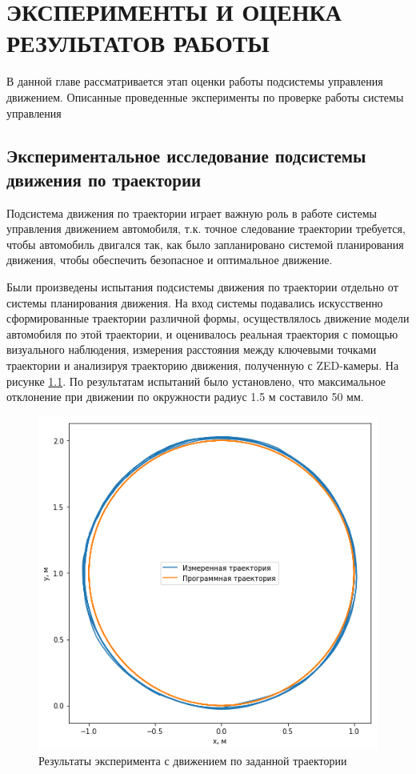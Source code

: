 \chapter{ЭКСПЕРИМЕНТЫ И ОЦЕНКА РЕЗУЛЬТАТОВ РАБОТЫ}

В данной главе рассматривается этап оценки работы подсистемы
управления движением. Описанные проведенные эксперименты по проверке
работы системы управления

\section{Экспериментальное исследование подсистемы движения по траектории }
Подсистема движения по траектории играет важную роль в работе системы управления движением автомобиля, т.к. точное
следование траектории требуется, чтобы автомобиль двигался так, как было запланировано системой планирования движения,
чтобы обеспечить безопасное и оптимальное движение.

Были произведены испытания подсистемы движения по траектории отдельно от системы планирования движения.
На вход системы подавались искусственно сформированные траектории различной формы, осуществлялось движение модели
автомобиля по этой траектории, и оценивалось реальная траектория с помощью визуального наблюдения, измерения расстояния
между ключевыми точками траектории и анализируя траекторию движения, полученную с ZED-камеры. На рисунке
\ref{img:path_moving_test}. По результатам испытаний было установлено, что максимальное отклонение при движении
по окружности радиус 1.5 м составило 50 мм.

\begin{figure}[h]
    \centering
    \includegraphics[width=0.7\linewidth]{images/path_moving_test}
    \caption{Результаты эксперимента с движением по заданной траектории}
    \label{img:path_moving_test}
\end{figure}

